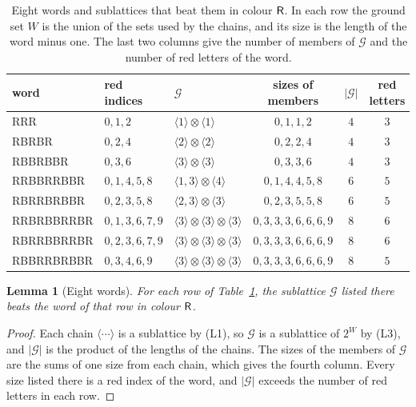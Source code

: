 \documentclass[11pt,reqno]{amsart}
\numberwithin{equation}{section}
\theoremstyle{plain}
\newtheorem{lemma}[theorem]{Lemma}
\theoremstyle{definition}
\theoremstyle{remark}
\newcommand{\w}[1]{\textsf{\upshape #1}}
\newcommand{\cG}{\mathcal{G}}
\begin{document}
\begin{table}[t]
\centering
\small
\renewcommand{\arraystretch}{1.15}
\begin{tabular}{@{}lllccc@{}}
\hline
word & red indices & $\cG$ & sizes of members & $|\cG|$ & red letters\\
\hline
\w{RRR} & $0,1,2$ & $\langle1\rangle\otimes\langle1\rangle$
  & $0,1,1,2$ & $4$ & $3$\\
\w{RBRBR} & $0,2,4$ & $\langle2\rangle\otimes\langle2\rangle$
  & $0,2,2,4$ & $4$ & $3$\\
\w{RBBRBBR} & $0,3,6$ & $\langle3\rangle\otimes\langle3\rangle$
  & $0,3,3,6$ & $4$ & $3$\\
\w{RRBBRRBBR} & $0,1,4,5,8$ & $\langle1,3\rangle\otimes\langle4\rangle$
  & $0,1,4,4,5,8$ & $6$ & $5$\\
\w{RBRRBRBBR} & $0,2,3,5,8$ & $\langle2,3\rangle\otimes\langle3\rangle$
  & $0,2,3,5,5,8$ & $6$ & $5$\\
\w{RRBRBBRRBR} & $0,1,3,6,7,9$ &
  $\langle3\rangle\otimes\langle3\rangle\otimes\langle3\rangle$
  & $0,3,3,3,6,6,6,9$ & $8$ & $6$\\
\w{RBRRBBRRBR} & $0,2,3,6,7,9$ &
  $\langle3\rangle\otimes\langle3\rangle\otimes\langle3\rangle$
  & $0,3,3,3,6,6,6,9$ & $8$ & $6$\\
\w{RBBRRBRBBR} & $0,3,4,6,9$ &
  $\langle3\rangle\otimes\langle3\rangle\otimes\langle3\rangle$
  & $0,3,3,3,6,6,6,9$ & $8$ & $5$\\
\hline
\end{tabular}
\caption{Eight words and sublattices that beat them in colour $\w{R}$.
In each row the ground set $W$ is the union of the sets used by the
chains, and its size is the length of the word minus one. The last two
columns give the number of members of $\cG$ and the number of red letters
of the word.}
\label{tab:gadgets}
\end{table}

\begin{lemma}[Eight words]
\label{lem:gadgets}
For each row of Table~\ref{tab:gadgets}, the sublattice $\cG$ listed
there beats the word of that row in colour $\w{R}$.
\end{lemma}

\begin{proof}
Each chain $\langle\cdots\rangle$ is a sublattice by (L1), so $\cG$ is a
sublattice of $2^{W}$ by (L3), and $|\cG|$ is the product of the lengths
of the chains. The sizes of the members of $\cG$ are the sums of one size
from each chain, which gives the fourth column. Every size listed there is
a red index of the word, and $|\cG|$ exceeds the number of red letters in
each row.
\end{proof}
\end{document}
